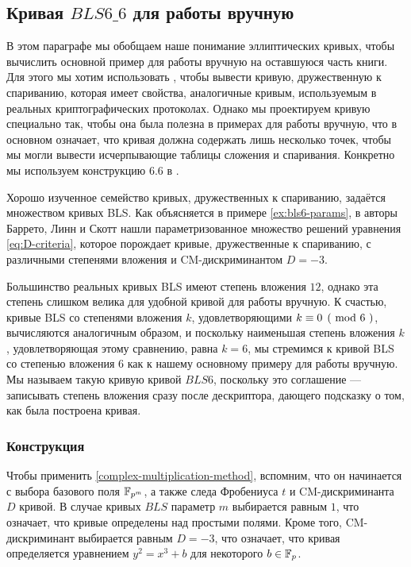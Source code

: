 \subsection{Кривая $BLS6\_6$ для работы вручную}\label{BLS6}

В этом параграфе мы обобщаем наше понимание эллиптических кривых, чтобы вычислить основной пример для работы вручную на оставшуюся часть книги. Для этого мы хотим использовать , чтобы вывести кривую, дружественную к спариванию, которая имеет свойства, аналогичные кривым, используемым в реальных криптографических протоколах. Однако мы проектируем кривую специально так, чтобы она была полезна в примерах для работы вручную, что в основном означает, что кривая должна содержать лишь несколько точек, чтобы мы могли вывести исчерпывающие таблицы сложения и спаривания. Конкретно мы используем конструкцию 6.6 в \cite{freeman-2020}.

Хорошо изученное семейство кривых, дружественных к спариванию, задаётся множеством кривых BLS. Как объясняется в примере \ref{ex:bls6-params}, в \cite{bls-02} авторы Баррето, Линн и Скотт нашли параметризованное множество решений уравнения \ref{eq:D-criteria}, которое порождает кривые, дружественные к спариванию, с различными степенями вложения и CM-дискриминантом $D = -3$. 

Большинство реальных кривых BLS имеют степень вложения $12$, однако эта степень слишком велика для удобной кривой для работы вручную. К счастью, кривые BLS со степенями вложения $k$, удовлетворяющими $\kongru{k}{0}{6}$, вычисляются аналогичным образом, и поскольку наименьшая степень вложения $k$, удовлетворяющая этому сравнению, равна $k=6$, мы стремимся к кривой BLS со степенью вложения $6$ как к нашему основному примеру для работы вручную. Мы называем такую кривую кривой $BLS6$, поскольку это соглашение — записывать степень вложения сразу после дескриптора, дающего подсказку о том, как была построена кривая.  

\subsubsection{Конструкция}
Чтобы применить  \ref{complex-multiplication-method}, вспомним, что он начинается с выбора базового поля $\mathbb{F}_{p^m}$, а также следа Фробениуса $t$ и CM-дискриминанта $D$ кривой. В случае кривых $BLS$ параметр $m$ выбирается равным $1$, что означает, что кривые определены над простыми полями. Кроме того, CM-дискриминант выбирается равным $D=-3$, что означает, что кривая определяется уравнением $y^2 = x^3 +b$ для некоторого $b\in \mathbb{F}_p$. 

